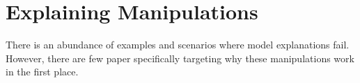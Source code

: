 \section{Explaining Manipulations}
\label{sec:explaining_manipulations}


There is an abundance of examples and scenarios where model explanations fail. However, there are few paper specifically targeting why these manipulations work in the first place. 
